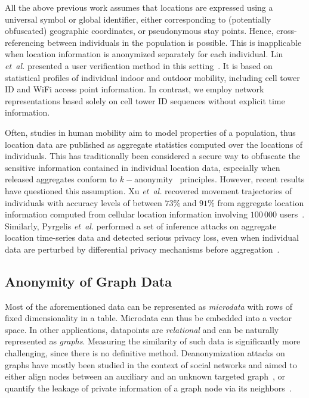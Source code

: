 All the above previous work assumes that locations are expressed using a universal symbol or global identifier, either corresponding to (potentially obfuscated) geographic coordinates, or pseudonymous stay points.
Hence, cross-referencing between individuals in the population is possible.
This is inapplicable when location information is anonymized separately for each individual.
Lin \emph{et~al.} presented a user verification method in this setting~\cite{LinMobile}.
It is based on statistical profiles of individual indoor and outdoor mobility, including cell tower ID and WiFi access point information.
In contrast, we employ network representations based solely on cell tower ID sequences without explicit time information.

Often, studies in human mobility aim to model properties of a population, thus location data are published as aggregate statistics computed over the locations of individuals.
This has traditionally been considered a secure way to obfuscate the sensitive information contained in individual location data, especially when released aggregates conform to $ k-$anonymity~\cite{sweeney2002k} principles.
However, recent results have questioned this assumption.
Xu \emph{et~al.} recovered movement trajectories of individuals with accuracy levels of between $73\%$ and $91\%$ from aggregate location information computed from cellular location information involving $100\,000$ users~\cite{xu2017trajectory}. Similarly, Pyrgelis \emph{et~al.} performed a set of inference attacks on aggregate location time-series data and detected serious privacy loss, even when individual data are perturbed by differential privacy mechanisms before aggregation~\cite{pyrgelis2017does}.

\subsection{Anonymity of Graph Data }
Most of the aforementioned data can be represented as \emph{microdata} with rows of fixed dimensionality in a table.
Microdata can thus be embedded into a vector space.
In other applications, datapoints are \emph{relational} and can be naturally represented as \emph{graphs}.
Measuring the similarity of such data is significantly more challenging, since there is no definitive method.
Deanonymization attacks on graphs have mostly been studied in the context of social networks and aimed to either align nodes between an auxiliary and an unknown targeted graph~\cite{narayanan2009anonymizing, sharad2014}, or quantify the leakage of private information of a graph node via its neighbors~\cite{zheleva09}.

